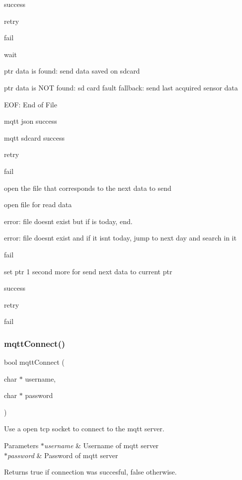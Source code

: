 success

retry

fail

wait

ptr data is found\+: send data saved on sdcard

ptr data is N\+OT found\+: sd card fault fallback\+: send last acquired sensor data

E\+OF\+: End of File

mqtt json success

mqtt sdcard success

retry

fail

open the file that corresponds to the next data to send

open file for read data

error\+: file doesn\textquotesingle{}t exist but if is today, end.

error\+: file doesn\textquotesingle{}t exist and if it isn\textquotesingle{}t today, jump to next day and search in it

fail

set ptr 1 second more for send next data to current ptr

success

retry

fail \mbox{\label{rmap_8ino_a9f5e5ca8c47d4536dd1805e89fbb7db2}} 
\subsubsection{\texorpdfstring{mqtt\+Connect()}{mqttConnect()}}
{\footnotesize\ttfamily bool mqtt\+Connect (\begin{DoxyParamCaption}\item[{char $\ast$}]{username,  }\item[{char $\ast$}]{password }\end{DoxyParamCaption})}



Use a open tcp socket to connect to the mqtt server. 


\begin{DoxyParams}{Parameters}
{\em $\ast$username} & Username of mqtt server \\
\hline
{\em $\ast$password} & Password of mqtt server \\
\hline
\end{DoxyParams}
\begin{DoxyReturn}{Returns}
true if connection was succesful, false otherwise. 
\end{DoxyReturn}
\mbox{\label{rmap_8ino_aa0d50218413a12917f8c70ef4e1e1e72}} 
